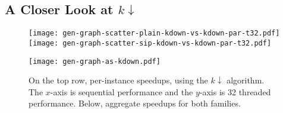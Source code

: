 \documentclass[sigconf]{acmart}
\begin{document}
% 
% 
% 
% 
% 
% 
% 
% 
% 
% 
% 
% 

\subsection{A Closer Look at $k{\downarrow}$}

\begin{figure}[tb]
    \texttt{[image: gen-graph-scatter-plain-kdown-vs-kdown-par-t32.pdf]}
    \hfill
    \texttt{[image: gen-graph-scatter-sip-kdown-vs-kdown-par-t32.pdf]}

    \vspace*{1em}

    \texttt{[image: gen-graph-as-kdown.pdf]}

    \caption{On the top row, per-instance speedups, using the $k{\downarrow}$ algorithm. The
    $x$-axis is sequential performance and the $y$-axis is 32 threaded performance. Below,
    aggregate speedups for both families.}
\end{figure}
\end{document}

